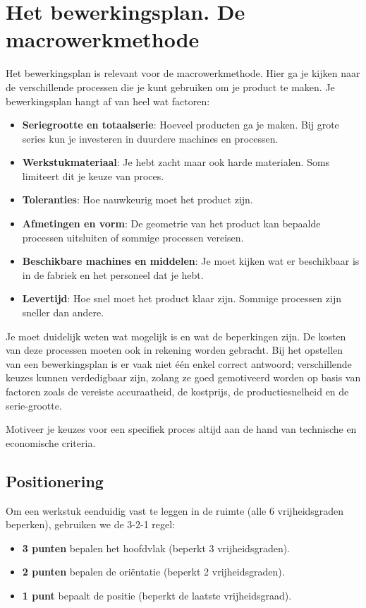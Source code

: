 \documentclass[a4paper,12pt,twoside]{report}
\begin{document}
\section{Het bewerkingsplan. De macrowerkmethode}
Het bewerkingsplan is relevant voor de macrowerkmethode.
Hier ga je kijken naar de verschillende processen die je kunt gebruiken om je product te maken.
Je bewerkingsplan hangt af van heel wat factoren:
\begin{itemize}
	\item \textbf{Seriegrootte en totaalserie}: Hoeveel producten ga je maken. Bij grote series kun je investeren in duurdere machines en processen.
	\item \textbf{Werkstukmateriaal}: Je hebt zacht maar ook harde materialen. Soms limiteert dit je keuze van proces.
	\item \textbf{Toleranties}: Hoe nauwkeurig moet het product zijn.
	\item \textbf{Afmetingen en vorm}: De geometrie van het product kan bepaalde processen uitsluiten of sommige processen vereisen.
	\item \textbf{Beschikbare machines en middelen}: Je moet kijken wat er beschikbaar is in de fabriek en het personeel dat je hebt.
	\item \textbf{Levertijd}: Hoe snel moet het product klaar zijn. Sommige processen zijn sneller dan andere.
\end{itemize}

Je moet duidelijk weten wat mogelijk is en wat de beperkingen zijn. De kosten van deze processen moeten ook in rekening worden gebracht. Bij het opstellen van een bewerkingsplan is er vaak niet één enkel correct antwoord; verschillende keuzes kunnen verdedigbaar zijn, zolang ze goed gemotiveerd worden op basis van factoren zoals de vereiste accuraatheid, de kostprijs, de productiesnelheid en de serie-grootte.

\begin{examenbox}
	Motiveer je keuzes voor een specifiek proces altijd aan de hand van technische en economische criteria.
\end{examenbox}

\subsection{Positionering}

\begin{conceptbox}[title=3-2-1 Methode]
    Om een werkstuk eenduidig vast te leggen in de ruimte (alle 6 vrijheidsgraden beperken), gebruiken we de 3-2-1 regel:
    \begin{itemize}
        \item \textbf{3 punten} bepalen het hoofdvlak (beperkt 3 vrijheidsgraden).
        \item \textbf{2 punten} bepalen de oriëntatie (beperkt 2 vrijheidsgraden).
        \item \textbf{1 punt} bepaalt de positie (beperkt de laatste vrijheidsgraad).
    \end{itemize}
\end{conceptbox}
\end{document}
